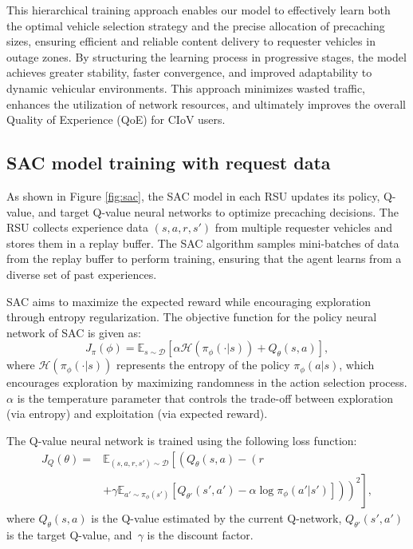 \documentclass{aims}
\numberwithin{equation}{section}
\begin{document}
This hierarchical training approach enables our model to effectively learn both the optimal vehicle selection strategy and the precise allocation of precaching sizes, ensuring efficient and reliable content delivery to requester vehicles in outage zones.
By structuring the learning process in progressive stages, the model achieves greater stability, faster convergence, and improved adaptability to dynamic vehicular environments.
This approach minimizes wasted traffic, enhances the utilization of network resources, and ultimately improves the overall Quality of Experience (QoE) for CIoV users.

\subsection{SAC model training with request data}
As shown in Figure \ref{fig:sac}, the SAC model in each RSU updates its policy, Q-value, and target Q-value neural networks to optimize precaching decisions.
The RSU collects experience data $(s, a, r, s')$ from multiple requester vehicles and stores them in a replay buffer.
The SAC algorithm samples mini-batches of data from the replay buffer to perform training, ensuring that the agent learns from a diverse set of past experiences.

SAC aims to maximize the expected reward while encouraging exploration through entropy regularization.
The objective function for the policy neural network of SAC is given as:
\begin{equation}
    J_{\pi}(\phi) = \mathbb{E}_{s \sim \mathcal{D}} \left[ \alpha \mathcal{H}(\pi_{\phi}(\cdot|s)) + Q_{\theta}(s, a) \right],
\end{equation}
where $\mathcal{H}(\pi_{\phi}(\cdot|s))$ represents the entropy of the policy $\pi_{\phi}(a|s)$, which encourages exploration by maximizing randomness in the action selection process.
$\alpha$ is the temperature parameter that controls the trade-off between exploration (via entropy) and exploitation (via expected reward).

The Q-value neural network is trained using the following loss function:
\begin{equation}
    \begin{split}
        J_Q(\theta) = & \mathbb{E}_{(s, a, r, s') \sim \mathcal{D}} \left[ \left( Q_{\theta}(s, a) - \left( r \right.\right.\right.\\
        & \left.\left.\left.+ \gamma \mathbb{E}_{a' \sim \pi_{\phi}(s')} [Q_{\theta'}(s', a') - \alpha \log \pi_{\phi}(a'|s')] \right) \right)^2 \right],
    \end{split}
\end{equation}
where $Q_{\theta}(s, a)$ is the Q-value estimated by the current Q-network, $Q_{\theta'}(s', a')$ is the target Q-value, and~$\gamma$ is the discount factor.
\end{document}
